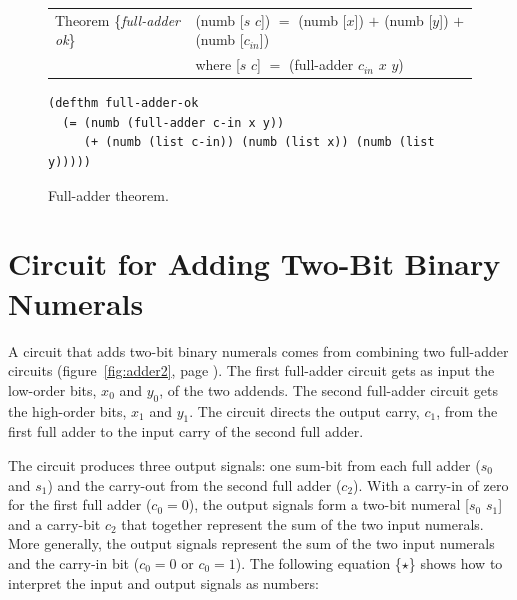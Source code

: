 \begin{figure}
\begin{center}
\begin{tabular}{ll}
Theorem \{\emph{full-adder ok}\} & \textsf{(numb [$s$ $c$])} $=$ \textsf{(numb [$x$])} $+$ \textsf{(numb [$y$])} $+$ \textsf{(numb [$c_{in}$])} \\
                                 & where \textsf{[$s$ $c$]} $=$ \textsf{(full-adder $c_{in}$ $x$ $y$)} \\
\end{tabular}
\begin{code}
\begin{verbatim}
(defthm full-adder-ok
  (= (numb (full-adder c-in x y))
     (+ (numb (list c-in)) (numb (list x)) (numb (list y)))))
\end{verbatim}
\end{code}
\end{center}
\caption{Full-adder theorem.}
\label{fig:full-adder-thm}
\end{figure}

\section{Circuit for Adding Two-Bit Binary Numerals}
\label{sec:adding-2-bit-numerals}

A circuit that adds two-bit binary numerals
comes from combining two full-adder circuits
(figure~\ref{fig:adder2}, page \pageref{fig:adder2}).
The first full-adder circuit gets as input the
low-order bits, $x_0$ and $y_0$,  of the two addends.
The second full-adder circuit gets the high-order bits,
$x_1$ and $y_1$.
The circuit directs the output carry, $c_1$, from
the first full adder to the input carry of the
second full adder.

The circuit produces three output signals: one sum-bit from
each full adder ($s_0$ and $s_1$) and the carry-out
from the second full adder ($c_2$).
With a carry-in of zero for the first full adder
($c_0 = 0$), the output signals form a two-bit
numeral \textsf{[$s_0$ $s_1$]} and a carry-bit $c_2$
that together represent the sum of the two input numerals.
More generally, the output signals
represent the sum of the two input numerals and the
carry-in bit ($c_0 = 0$ or $c_0 = 1$).
The following equation \{$\star$\} shows how to interpret the
input and output signals as numbers:

